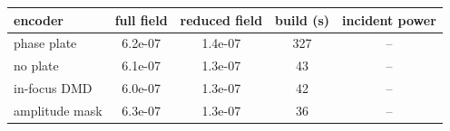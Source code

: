 \begin{tabular}{@{}lcccc@{}}\toprule
encoder & full field & reduced field & build (s) & incident power\\\midrule
phase plate & 6.2e-07 & 1.4e-07 & 327 & --\\
no plate & 6.1e-07 & 1.3e-07 & 43 & --\\
in-focus DMD & 6.0e-07 & 1.3e-07 & 42 & --\\
amplitude mask & 6.3e-07 & 1.3e-07 & 36 & --\\
\bottomrule\end{tabular}
